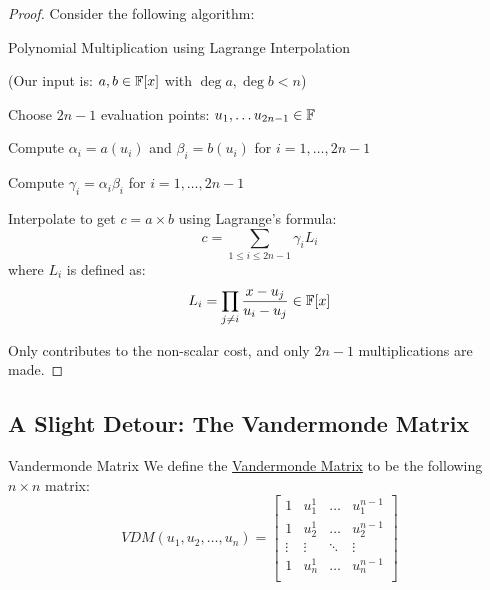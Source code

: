 \begin{proof}
Consider the following algorithm:

\begin{algorithm}[H]
    \caption{Polynomial Multiplication using Lagrange Interpolation}\label{alg:poly-mult-lagrange}

    (Our input is: $a,b \in \operatorname{\mathbb{F}}[x]$ with $\deg a, \deg b < n$)

    \BlankLine
    \nl Choose $2n - 1$ evaluation points: $u_1, \ldots u_{2n - 1} \in \operatorname{\mathbb{F}}$

    \nl Compute $\alpha_i = a(u_i)$ and $\beta_i = b(u_i)$ for $i = 1,\ldots, 2n - 1$

    \nl \label{step:non-scalar-mults} Compute $\gamma_i = \alpha_i\beta_i$ for $i = 1,\ldots, 2n - 1$ 

    \nl Interpolate to get $c = a \times b$ using Lagrange's formula:
    \begin{equation}
        c = \sum_{1 \leq i \leq 2n-1} \gamma_i L_i
    \end{equation}
    where $L_i$ is defined as:
    \begin{equation}
        L_i = \prod_{j \neq i} \frac{x - u_j}{u_i - u_j} \in \operatorname{\mathbb{F}}[x]
    \end{equation}
\end{algorithm}
Only  contributes to the non-scalar cost, and only $2n - 1$ multiplications are made.
\end{proof}

\subsection{A Slight Detour: The Vandermonde Matrix}
\begin{definition}{Vandermonde Matrix}{}
    We define the \ul{Vandermonde Matrix} to be the following $n \times n$ matrix:
    \begin{equation}
        VDM(u_1, u_2, \ldots, u_n) = 
        \begin{bmatrix}
            1 & u_1^1 & \ldots & u_1^{n-1} \\
            1 & u_2^1 & \ldots & u_2^{n-1} \\
            \vdots & \vdots & \ddots & \vdots \\
            1 & u_n^1 & \ldots & u_n^{n-1} \\
        \end{bmatrix}
    \end{equation}
\end{definition}

